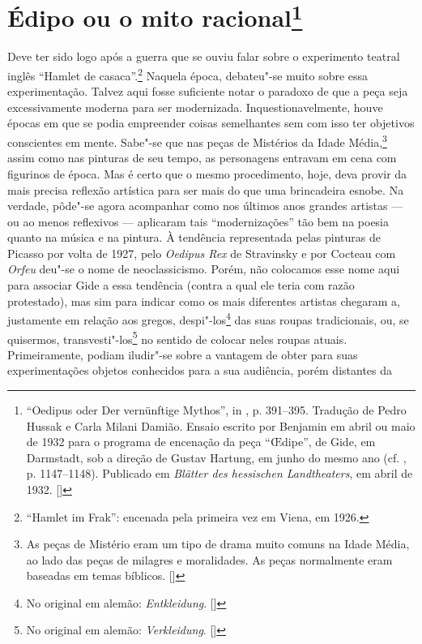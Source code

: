 \chapter{Édipo ou o mito racional\footnote[*]{``Oedipus oder Der vernünftige Mythos'', in , p. 391--395. Tradução de
  Pedro Hussak e Carla Milani Damião. Ensaio escrito
  por Benjamin em abril ou maio de 1932 para o programa de encenação da
  peça ``\OE dipe'', de Gide, em Darmstadt, sob a direção de Gustav Hartung,
  em junho do mesmo ano (cf. , p. 1147--1148). Publicado em
  \emph{Blätter des hessischen Landtheaters}, em abril de 1932. []}}

Deve ter sido logo após a guerra que se ouviu falar sobre o experimento
teatral inglês ``Hamlet de casaca''.\footnote{``Hamlet im Frak'':
  encenada pela primeira vez em Viena, em 1926. \versal{[N.~O.]}} Naquela época,
debateu"-se muito sobre essa experimentação. Talvez aqui fosse suficiente
notar o paradoxo de que a peça seja excessivamente moderna para ser
modernizada. Inquestionavelmente, houve épocas em que se podia
empreender coisas semelhantes sem com isso ter objetivos conscientes em mente.
Sabe"-se que nas peças de Mistérios da Idade Média,\footnote{As peças de Mistério eram um tipo de drama muito comuns na Idade Média, ao lado das peças de milagres e moralidades. As peças normalmente eram baseadas em temas bíblicos. []} assim como nas
pinturas de seu tempo, as personagens entravam em cena com figurinos de
época. Mas é certo que o mesmo procedimento, hoje, deva provir da mais
precisa reflexão artística para ser mais do que uma brincadeira esnobe.
Na verdade, pôde"-se agora acompanhar como nos últimos anos grandes
artistas --- ou ao menos reflexivos --- aplicaram tais ``modernizações''
tão bem na poesia quanto na música e na pintura. À tendência
representada pelas pinturas de Picasso por volta de 1927, pelo
\emph{Oedipus Rex} de Stravinsky e por Cocteau com \emph{Orfeu} deu"-se o
nome de neoclassicismo. Porém, não colocamos esse nome aqui para
associar Gide a essa tendência (contra a qual ele teria com razão
protestado), mas sim para indicar como os mais diferentes artistas
chegaram a, justamente em relação aos gregos, despi"-los\footnote{No original em alemão: \emph{Entkleidung}. []} das suas roupas tradicionais, ou, se quisermos, transvesti"-los\footnote{No original em alemão: \emph{Verkleidung}. []} no sentido de colocar neles roupas atuais.
Primeiramente, podiam iludir"-se sobre a vantagem de
obter para suas experimentações objetos conhecidos para a sua audiência, porém distantes da

